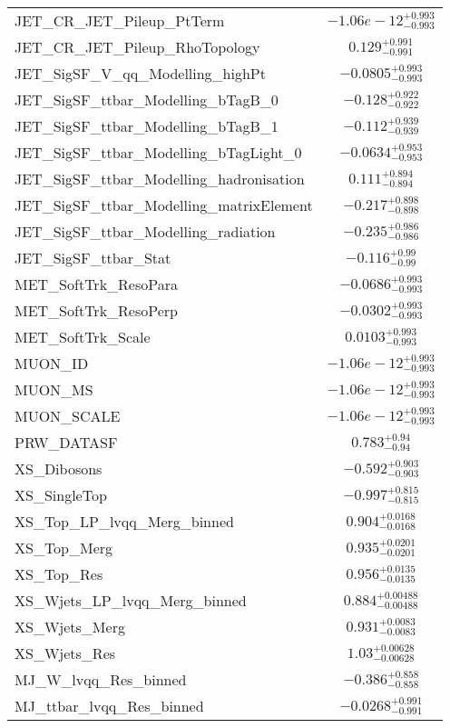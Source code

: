 \begin{tabular}{|l|c|}
JET\_CR\_JET\_Pileup\_PtTerm & $-1.06e-12^{+0.993}_{-0.993}$ \\
JET\_CR\_JET\_Pileup\_RhoTopology & $0.129^{+0.991}_{-0.991}$ \\
JET\_SigSF\_V\_qq\_Modelling\_highPt & $-0.0805^{+0.993}_{-0.993}$ \\
JET\_SigSF\_ttbar\_Modelling\_bTagB\_0 & $-0.128^{+0.922}_{-0.922}$ \\
JET\_SigSF\_ttbar\_Modelling\_bTagB\_1 & $-0.112^{+0.939}_{-0.939}$ \\
JET\_SigSF\_ttbar\_Modelling\_bTagLight\_0 & $-0.0634^{+0.953}_{-0.953}$ \\
JET\_SigSF\_ttbar\_Modelling\_hadronisation & $0.111^{+0.894}_{-0.894}$ \\
JET\_SigSF\_ttbar\_Modelling\_matrixElement & $-0.217^{+0.898}_{-0.898}$ \\
JET\_SigSF\_ttbar\_Modelling\_radiation & $-0.235^{+0.986}_{-0.986}$ \\
JET\_SigSF\_ttbar\_Stat & $-0.116^{+0.99}_{-0.99}$ \\
MET\_SoftTrk\_ResoPara & $-0.0686^{+0.993}_{-0.993}$ \\
MET\_SoftTrk\_ResoPerp & $-0.0302^{+0.993}_{-0.993}$ \\
MET\_SoftTrk\_Scale & $0.0103^{+0.993}_{-0.993}$ \\
MUON\_ID & $-1.06e-12^{+0.993}_{-0.993}$ \\
MUON\_MS & $-1.06e-12^{+0.993}_{-0.993}$ \\
MUON\_SCALE & $-1.06e-12^{+0.993}_{-0.993}$ \\
PRW\_DATASF & $0.783^{+0.94}_{-0.94}$ \\
XS\_Dibosons & $-0.592^{+0.903}_{-0.903}$ \\
XS\_SingleTop & $-0.997^{+0.815}_{-0.815}$ \\
XS\_Top\_LP\_lvqq\_Merg\_binned & $0.904^{+0.0168}_{-0.0168}$ \\
XS\_Top\_Merg & $0.935^{+0.0201}_{-0.0201}$ \\
XS\_Top\_Res & $0.956^{+0.0135}_{-0.0135}$ \\
XS\_Wjets\_LP\_lvqq\_Merg\_binned & $0.884^{+0.00488}_{-0.00488}$ \\
XS\_Wjets\_Merg & $0.931^{+0.0083}_{-0.0083}$ \\
XS\_Wjets\_Res & $1.03^{+0.00628}_{-0.00628}$ \\
MJ\_W\_lvqq\_Res\_binned & $-0.386^{+0.858}_{-0.858}$ \\
MJ\_ttbar\_lvqq\_Res\_binned & $-0.0268^{+0.991}_{-0.991}$ \\

\end{tabular}
